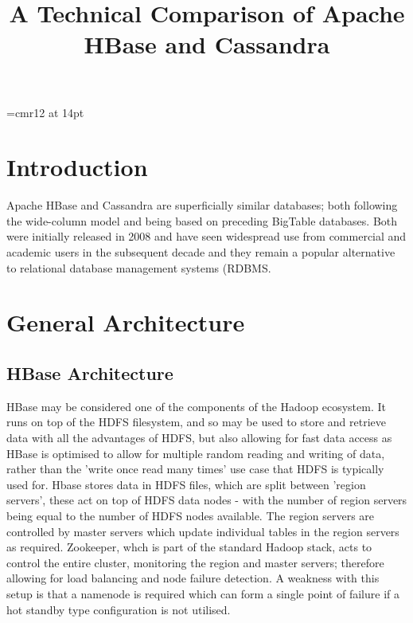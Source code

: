 \documentclass[10pt]{article}
\begin{document}
%
\font\myfont=cmr12 at 14pt
\title{{\myfont A Technical Comparison of Apache HBase and Cassandra }}
\author{\vspace{-10ex}}
\date{\vspace{-10ex}}
\maketitle
%





\section{Introduction}
Apache HBase and Cassandra are superficially similar databases; both following the wide-column model and being based on preceding BigTable databases. Both were initially released in 2008 and have seen widespread use from commercial and academic users in the subsequent decade and they remain a popular alternative to relational database management systems (RDBMS.

\section{General Architecture}
\subsection {HBase Architecture}
HBase may be considered one of the components of the Hadoop ecosystem. It runs on top of the HDFS filesystem, and so may be used to store and retrieve data with all the advantages of HDFS, but also allowing for fast data access as HBase is optimised to allow for multiple random reading and writing of data, rather than the 'write once read many times' use case that HDFS is typically used for.  Hbase stores data in HDFS files, which are split between 'region servers', these act on top of HDFS data nodes - with the number of region servers being equal to the number of HDFS nodes available. The region servers are controlled by master servers which update individual tables in the region servers as required. Zookeeper, whch is part of the standard Hadoop stack, acts to control the entire cluster, monitoring the region and master servers; therefore allowing for load balancing and node failure detection. A weakness with this setup is that a namenode is required which can form a single point of failure if a hot standby type configuration is not utilised.\\
\end{document}

